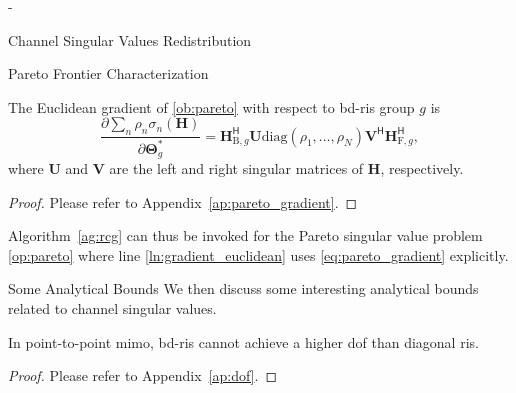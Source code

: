 \begin{section}{-}
\begin{subsection}{Channel Singular Values Redistribution}
\begin{subsubsection}{Pareto Frontier Characterization}
			\begin{lemma}\label{lm:pareto_gradient}
				The Euclidean gradient of \eqref{ob:pareto} with respect to \gls{bd}-\gls{ris} group $g$ is
				\begin{equation}
					\frac{\partial \sum_n \rho_n \sigma_n(\mathbf{H})}{\partial \mathbf{\Theta}_g^*} = \mathbf{H}_{\mathrm{B},g}^\mathsf{H} \mathbf{U} \mathrm{diag}(\rho_1,\ldots,\rho_N) \mathbf{V}^\mathsf{H} \mathbf{H}_{\mathrm{F},g}^\mathsf{H},
					\label{eq:pareto_gradient}
				\end{equation}
				where $\mathbf{U}$ and $\mathbf{V}$ are the left and right singular matrices of $\mathbf{H}$, respectively.
			\end{lemma}
			\begin{proof}
				Please refer to Appendix~\ref{ap:pareto_gradient}.
			\end{proof}

			Algorithm~\ref{ag:rcg} can thus be invoked for the Pareto singular value problem \eqref{op:pareto} where line \ref{ln:gradient_euclidean} uses \eqref{eq:pareto_gradient} explicitly.
		\end{subsubsection}

		\begin{subsubsection}{Some Analytical Bounds}\label{sc:bounds}
			We then discuss some interesting analytical bounds related to channel singular values.
			\begin{proposition}\label{pp:dof}
				In point-to-point \gls{mimo}, \gls{bd}-\gls{ris} cannot achieve a higher \gls{dof} than diagonal \gls{ris}.
			\end{proposition}
			\begin{proof}
				Please refer to Appendix~\ref{ap:dof}.
			\end{proof}


\end{subsubsection}
\end{subsection}
\end{section}
